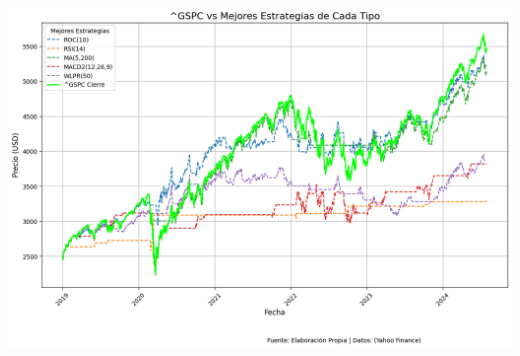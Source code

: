 \documentclass[a0,portrait]{a0poster}
\begin{document}
\begin{multicols}{2}

    \begin{minipage}{\linewidth}
    \centering
    \includegraphics[width=0.9\linewidth]{grafico_mejores_estrategias_^GSPC.png}
    

\end{minipage}
\end{multicols}
\end{document}
